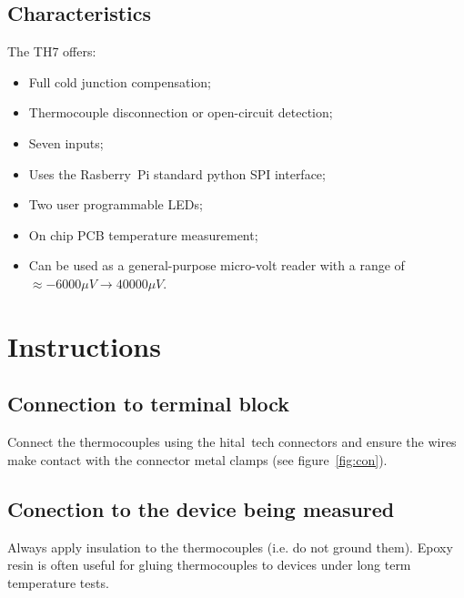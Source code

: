 \documentclass[10pt,foldmark]{leaflet}
\begin{document}
\subsection{Characteristics}
The TH7 offers:
\begin{itemize}
 \item Full cold junction compensation;
 \item Thermocouple disconnection or open-circuit  detection;
 \item Seven inputs;
 \item Uses the Rasberry~Pi standard python SPI interface;
 \item Two user programmable LEDs;
 \item On chip PCB temperature measurement;
  \item Can be used as a general-purpose micro-volt 
  reader with a range of $\approx -6000 \mu V \rightarrow 40000 \mu V$.
\end{itemize} 

\section{Instructions}
\subsection{Connection to terminal block}
%
Connect the thermocouples using the hital~tech connectors and ensure the wires make contact with the 
connector metal clamps (see figure~\ref{fig:con}).
%
\subsection{Conection to the device being measured}
%
Always apply insulation to the thermocouples (i.e. do not ground them).
%
Epoxy resin is often useful for gluing thermocouples to devices under long term temperature tests.
\end{document}
